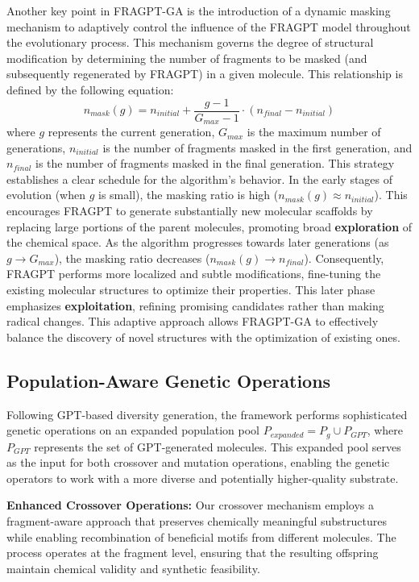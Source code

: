 \documentclass[lettersize,journal]{IEEEtran}
\begin{document}
Another key point in FRAGPT-GA is the introduction of a dynamic masking mechanism to adaptively control the influence of the FRAGPT model throughout the evolutionary process. This mechanism governs the degree of structural modification by determining the number of fragments to be masked (and subsequently regenerated by FRAGPT) in a given molecule. This relationship is defined by the following equation:
\begin{equation}
n_{mask}(g) = n_{initial} + \frac{g-1}{G_{max}-1} \cdot (n_{final} - n_{initial})
\end{equation}
where $g$ represents the current generation, $G_{max}$ is the maximum number of generations, $n_{initial}$ is the number of fragments masked in the first generation, and $n_{final}$ is the number of fragments masked in the final generation. This strategy establishes a clear schedule for the algorithm's behavior. In the early stages of evolution (when $g$ is small), the masking ratio is high ($n_{mask}(g) \approx n_{initial}$). This encourages FRAGPT to generate substantially new molecular scaffolds by replacing large portions of the parent molecules, promoting broad \textbf{exploration} of the chemical space. As the algorithm progresses towards later generations (as $g \to G_{max}$), the masking ratio decreases ($n_{mask}(g) \to n_{final}$). Consequently, FRAGPT performs more localized and subtle modifications, fine-tuning the existing molecular structures to optimize their properties. This later phase emphasizes \textbf{exploitation}, refining promising candidates rather than making radical changes. This adaptive approach allows FRAGPT-GA to effectively balance the discovery of novel structures with the optimization of existing ones.

\subsection{Population-Aware Genetic Operations}

Following GPT-based diversity generation, the framework performs sophisticated genetic operations on an expanded population pool $P_{expanded} = P_g \cup P_{GPT}$, where $P_{GPT}$ represents the set of GPT-generated molecules. This expanded pool serves as the input for both crossover and mutation operations, enabling the genetic operators to work with a more diverse and potentially higher-quality substrate.

\noindent \textbf{Enhanced Crossover Operations:} Our crossover mechanism employs a fragment-aware approach that preserves chemically meaningful substructures while enabling recombination of beneficial motifs from different molecules. The process operates at the fragment level, ensuring that the resulting offspring maintain chemical validity and synthetic feasibility.
\end{document}
